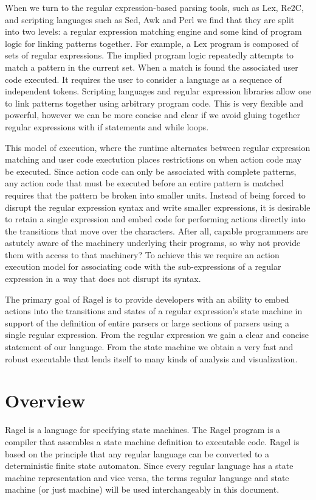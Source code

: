 \documentclass[letterpaper,11pt,oneside]{book}
\begin{document}
When we turn to the regular expression-based parsing tools, such as Lex, Re2C,
and scripting languages such as Sed, Awk and Perl we find that they are split
into two levels: a regular expression matching engine and some kind of program
logic for linking patterns together.  For example, a Lex program is composed of
sets of regular expressions. The implied program logic repeatedly attempts to
match a pattern in the current set. When a match is found the associated user
code executed. It requires the user to consider a language as a sequence of
independent tokens. Scripting languages and regular expression libraries allow
one to link patterns together using arbitrary program code.  This is very
flexible and powerful, however we can be more concise and clear if we avoid
gluing together regular expressions with if statements and while loops.

This model of execution, where the runtime alternates between regular
expression matching and user code exectution places restrictions on when
action code may be executed. Since action code can only be associated with
complete patterns, any action code that must be executed before an entire
pattern is matched requires that the pattern be broken into smaller units.
Instead of being forced to disrupt the regular expression syntax and write
smaller expressions, it is desirable to retain a single expression and embed
code for performing actions directly into the transitions that move over the
characters. After all, capable programmers are astutely aware of the machinery
underlying their programs, so why not provide them with access to that
machinery? To achieve this we require an action execution model for associating
code with the sub-expressions of a regular expression in a way that does not
disrupt its syntax.

The primary goal of Ragel is to provide developers with an ability to embed
actions into the transitions and states of a regular expression's state machine
in support of the definition of entire parsers or large sections of parsers
using a single regular expression.  From the regular expression we gain a clear
and concise statement of our language. From the state machine we obtain a very
fast and robust executable that lends itself to many kinds of analysis and
visualization.

\section{Overview}

Ragel is a language for specifying state machines. The Ragel program is a
compiler that assembles a state machine definition to executable code.  Ragel
is based on the principle that any regular language can be converted to a
deterministic finite state automaton. Since every regular language has a state
machine representation and vice versa, the terms regular language and state
machine (or just machine) will be used interchangeably in this document.
\end{document}

